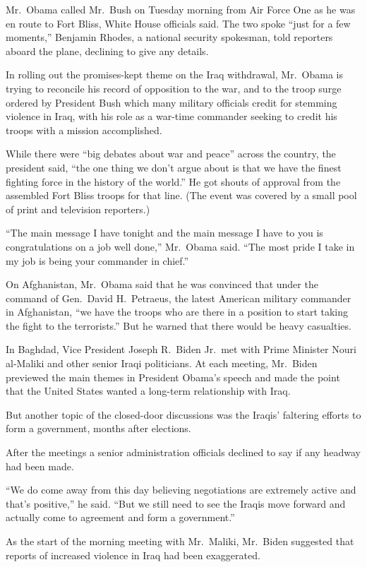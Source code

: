 ﻿\documentclass[12pt]{article}
\begin{document}
Mr.~Obama called Mr.~Bush on Tuesday morning from Air Force One as he was en route to Fort Bliss,
White House officials said. The two spoke ``just for a few moments,'' Benjamin Rhodes, a national
security spokesman, told reporters aboard the plane, declining to give any details.

In rolling out the promises-kept theme on the Iraq withdrawal, Mr.~Obama is trying to reconcile his
record of opposition to the war, and to the troop surge ordered by President Bush which many
military officials credit for stemming violence in Iraq, with his role as a war-time commander
seeking to credit his troops with a mission accomplished.

While there were ``big debates about war and peace'' across the country, the president said, ``the
one thing we don't argue about is that we have the finest fighting force in the history of the
world.'' He got shouts of approval from the assembled Fort Bliss troops for that line. (The event
was covered by a small pool of print and television reporters.)

``The main message I have tonight and the main message I have to you is congratulations on a job
well done,'' Mr.~Obama said. ``The most pride I take in my job is being your commander in chief.''

On Afghanistan, Mr.~Obama said that he was convinced that under the command of Gen.~David
H.~Petraeus, the latest American military commander in Afghanistan, ``we have the troops who are
there in a position to start taking the fight to the terrorists.'' But he warned that there would be
heavy casualties.

In Baghdad, Vice President Joseph R.~Biden Jr.~met with Prime Minister Nouri al-Maliki and other
senior Iraqi politicians. At each meeting, Mr.~Biden previewed the main themes in President Obama's
speech and made the point that the United States wanted a long-term relationship with Iraq.

But another topic of the closed-door discussions was the Iraqis' faltering efforts to form a
government, months after elections.

After the meetings a senior administration officials declined to say if any headway had been made.

``We do come away from this day believing negotiations are extremely active and that's positive,''
he said. ``But we still need to see the Iraqis move forward and actually come to agreement and form
a government.''

As the start of the morning meeting with Mr.~Maliki, Mr.~Biden suggested that reports of increased
violence in Iraq had been exaggerated.
\end{document}
